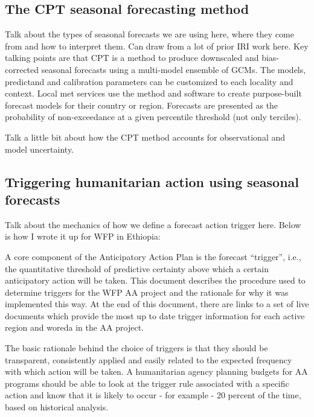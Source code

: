 \documentclass{ametsocV5}
\begin{document}
\subsection{The CPT seasonal forecasting method}


Talk about the types of seasonal forecasts we are using here, where they come from and how to interpret them. Can draw from a lot of prior IRI work here. Key talking points are that CPT is a method to produce downscaled and bias-corrected seasonal forecasts using a multi-model ensemble of GCMs. The models, predictand and calibration parameters can be customized to each locality and context. Local met services use the method and software to create purpose-built forecast models for their country or region. Forecasts are presented as the probability of non-exceedance at a given percentile threshold (not only terciles).

Talk a little bit about how the CPT method accounts for observational and model uncertainty.

\subsection{Triggering humanitarian action using seasonal forecasts}


Talk about the mechanics of how we define a forecast action trigger here. Below is how I wrote it up for WFP in Ethiopia: 

A core component of the Anticipatory Action Plan is the forecast “trigger”, i.e., the quantitative threshold of predictive certainty above which a certain anticipatory action will be taken. 
This document describes the procedure used to determine triggers for the WFP AA project and the rationale for why it was implemented this way. At the end of this document, there are links to a set of live documents which provide the most up to date trigger information for each active region and woreda in the AA project.

The basic rationale behind the choice of triggers is that they should be transparent, consistently applied and easily related to the expected frequency with which action will be taken. A humanitarian agency planning budgets for AA programs should be able to look at the trigger rule associated with a specific action and know that it is likely to occur - for example - 20 percent  of the time, based on historical analysis. 
\end{document}
